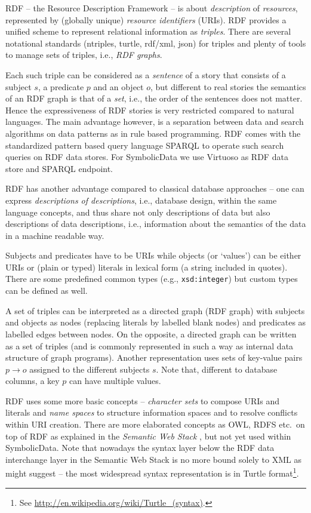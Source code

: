 \documentclass{llncs}
\newcommand{\SD}{{\sc Symbolic\-Data}}
\begin{document}
RDF -- the Resource Description Framework -- is about \emph{description} of
\emph{resources}, represented by (globally unique) \emph{resource identifiers}
(URIs).  RDF provides a unified scheme to represent relational information as
\emph{triples}.  There are several notational standards (ntriples, turtle,
rdf/xml, json) for triples and plenty of tools to manage sets of triples,
i.e., \emph{RDF graphs}.

Each such triple can be considered as a \emph{sentence} of a story that
consists of a subject $s$, a predicate $p$ and an object $o$, but different to
real stories the semantics of an RDF graph is that of a \emph{set}, i.e., the
order of the sentences does not matter.  Hence the expressiveness of RDF
stories is very restricted compared to natural languages. The main advantage
however, is a separation between data and search algorithms on data patterns
as in rule based programming.  RDF comes with the standardized pattern based
query language SPARQL to operate such search queries on RDF data stores.  For
{\SD} we use Virtuoso \cite{Virtuoso} as RDF data store and SPARQL endpoint.

RDF has another advantage compared to classical database approaches -- one can
express \emph{descriptions of descriptions}, i.e., database design, within the
same language concepts, and thus share not only descriptions of data but also
descriptions of data descriptions, i.e., information about the semantics of
the data in a machine readable way.

Subjects and predicates have to be URIs while objects (or `values') can be
either URIs or (plain or typed) literals in lexical form (a string included in
quotes). There are some predefined common types (e.g., \texttt{xsd:integer})
but custom types can be defined as well.

A set of triples can be interpreted as a directed graph (RDF graph) with
subjects and objects as nodes (replacing literals by labelled blank nodes) and
predicates as labelled edges between nodes. On the opposite, a directed graph
can be written as a set of triples (and is commonly represented in such a way
as internal data structure of graph programs). Another representation uses
sets of key-value pairs $p \to o$ assigned to the different subjects $s$.
Note that, different to database columns, a key $p$ can have multiple values.

RDF uses some more basic concepts -- \emph{character sets} to compose URIs and
literals and \emph{name spaces} to structure information spaces and to resolve
conflicts within URI creation.  There are more elaborated concepts as OWL,
RDFS etc.\ on top of RDF as explained in the \emph{Semantic Web Stack}
\cite{SWS}, but not yet used within {\SD}. Note that nowadays the syntax layer
below the RDF data interchange layer in the Semantic Web Stack is no more
bound solely to XML as \cite{SWS} might suggest -- the most widespread syntax
representation is in Turtle format\footnote{See
  \url{http://en.wikipedia.org/wiki/Turtle_(syntax)}.}.
\end{document}
